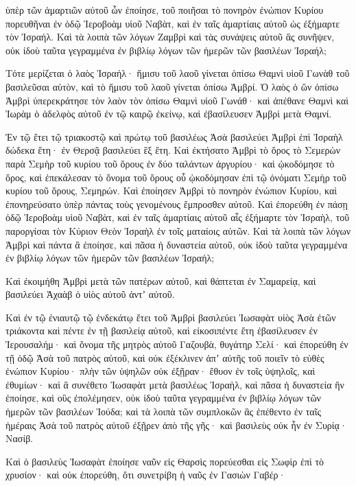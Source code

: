 {ὑπὲρ τῶν ἁμαρτιῶν αὐτοῦ ὧν ἐποίησε, τοῦ ποιῆσαι τὸ πονηρὸν ἐνώπιον Κυρίου πορευθῆναι ἐν ὁδῷ Ἱεροβοὰμ υἱοῦ Ναβὰτ, καὶ ἐν ταῖς ἁμαρτίαις αὐτοῦ ὡς ἐξήμαρτε τὸν Ἰσραήλ.
Καὶ τὰ λοιπὰ τῶν λόγων Ζαμβρὶ καὶ τὰς συνάψεις αὐτοῦ ἃς συνῆψεν, οὐκ ἰδοὺ ταῦτα γεγραμμένα ἐν βιβλίῳ λόγων τῶν ἡμερῶν τῶν βασιλέων Ἰσραήλ;
\par }{\PP {}Τότε μερίζεται ὁ λαὸς Ἰσραήλ· ἥμισυ τοῦ λαοῦ γίνεται ὀπίσω Θαμνὶ υἱοῦ Γωνὰθ τοῦ βασιλεῦσαι αὐτὸν, καὶ τὸ ἥμισυ τοῦ λαοῦ γίνεται ὀπίσω Ἀμβρί.
Ὁ λαὸς ὁ ὢν ὀπίσω Ἀμβρὶ ὑπερεκράτησε τὸν λαὸν τὸν ὀπίσω Θαμνὶ υἱοῦ Γωνάθ· καὶ ἀπέθανε Θαμνὶ καὶ Ἰωρὰμ ὁ ἀδελφὸς αὐτοῦ ἐν τῷ καιρῷ ἐκείνῳ, καὶ ἐβασίλευσεν Ἀμβρὶ μετὰ Θαμνί.
\par }{\PP {}Ἐν τῷ ἔτει τῷ τριακοστῷ καὶ πρώτῳ τοῦ βασιλέως Ἀσὰ βασιλεύει Ἀμβρὶ ἐπὶ Ἰσραὴλ δώδεκα ἔτη· ἐν Θερσᾷ βασιλεύει ἓξ ἔτη.
Καὶ ἐκτήσατο Ἀμβρὶ τὸ ὄρος τὸ Σεμερὼν παρὰ Σεμὴρ τοῦ κυρίου τοῦ ὄρους ἐν δύο ταλάντων ἀργυρίου· καὶ ᾠκοδόμησε τὸ ὄρος, καὶ ἐπεκάλεσαν τὸ ὄνομα τοῦ ὄρους οὗ ᾠκοδόμησαν ἐπὶ τῷ ὀνόματι Σεμὴρ τοῦ κυρίου τοῦ ὄρους, Σεμηρών.
Καὶ ἐποίησεν Ἀμβρὶ τὸ πονηρὸν ἐνώπιον Κυρίου, καὶ ἐπονηρεύσατο ὑπὲρ πάντας τοὺς γενομένους ἔμπροσθεν αὐτοῦ.
Καὶ ἐπορεύθη ἐν πάσῃ ὁδῷ Ἱεροβοὰμ υἱοῦ Ναβὰτ, καὶ ἐν ταῖς ἁμαρτίαις αὐτοῦ αἷς ἐξήμαρτε τὸν Ἰσραὴλ, τοῦ παροργίσαι τὸν Κύριον Θεὸν Ἰσραὴλ ἐν τοῖς ματαίοις αὐτῶν.
Καὶ τὰ λοιπὰ τῶν λόγων Ἀμβρὶ καὶ πάντα ἃ ἐποίησε, καὶ πᾶσα ἡ δυναστεία αὐτοῦ, οὐκ ἰδοὺ ταῦτα γεγραμμένα ἐν βιβλίῳ λόγων τῶν ἡμερῶν τῶν βασιλέων Ἰσραήλ;
\par }{\PP {}Καὶ ἐκοιμήθη Ἀμβρὶ μετὰ τῶν πατέρων αὐτοῦ, καὶ θάπτεται ἐν Σαμαρείᾳ, καὶ βασιλεύει Ἀχαὰβ ὁ υἱὸς αὐτοῦ ἀντʼ αὐτοῦ.
\par }{\PP {}Καὶ ἐν τῷ ἐνιαυτῷ τῷ ἑνδεκάτῳ ἔτει τοῦ Ἀμβρὶ βασιλεύει Ἰωσαφὰτ υἱὸς Ἀσὰ ἐτῶν τριάκοντα καὶ πέντε ἐν τῇ βασιλείᾳ αὐτοῦ, καὶ εἰκοσιπέντε ἔτη ἐβασίλευσεν ἐν Ἱερουσαλήμ· καὶ ὄνομα τῆς μητρὸς αὐτοῦ Γαζουβὰ, θυγάτηρ Σελί·
καὶ ἐπορεύθη ἐν τῇ ὁδῷ Ἀσὰ τοῦ πατρὸς αὐτοῦ, καὶ οὐκ ἐξέκλινεν ἀπʼ αὐτῆς τοῦ ποιεῖν τὸ εὐθὲς ἐνώπιον Κυρίου· πλὴν τῶν ὑψηλῶν οὐκ ἐξῇραν· ἔθυον ἐν τοῖς ὑψηλοῖς, καὶ ἐθυμίων·
καὶ ἃ συνέθετο Ἰωσαφὰτ μετὰ βασιλέως Ἰσραὴλ, καὶ πᾶσα ἡ δυναστεία ἣν ἐποίησε, καὶ οὓς ἐπολέμησεν, οὐκ ἰδοὺ ταῦτα γεγραμμένα ἐν βιβλίῳ λόγων τῶν ἡμερῶν τῶν βασιλέων Ἰούδα;
καὶ τὰ λοιπὰ τῶν συμπλοκῶν ἃς ἐπέθεντο ἐν ταῖς ἡμέραις Ἀσὰ τοῦ πατρὸς αὐτοῦ ἐξῇρεν ἀπὸ τῆς γῆς·
καὶ βασιλεὺς οὐκ ἦν ἐν Συρίᾳ· Νασίβ.
\par }{\PP {}Καὶ ὁ βασιλεὺς Ἰωσαφὰτ ἐποίησε ναῦν εἰς Θαρσὶς πορεύεσθαι εἰς Σωφὶρ ἐπὶ τὸ χρυσίον· καὶ οὐκ ἐπορεύθη, ὅτι συνετρίβη ἡ ναῦς ἐν Γασιὼν Γαβέρ·
}
